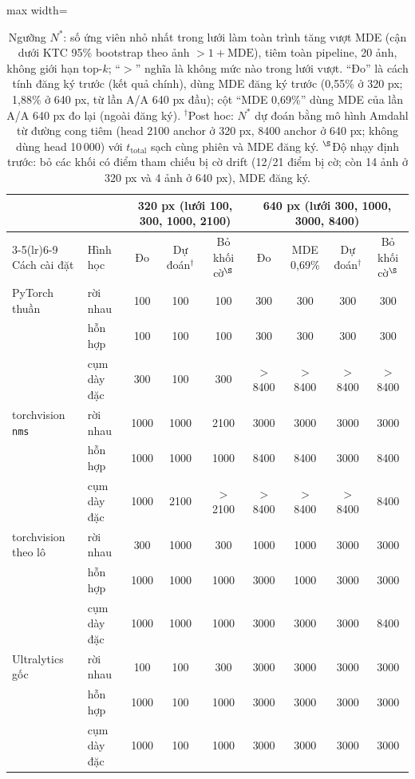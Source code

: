 \documentclass[a4paper,fleqn]{cas-dc}
\begin{document}
\begin{table}[!tp]
\centering\small
\caption{Ngưỡng $N^{*}$: số ứng viên nhỏ nhất trong lưới làm toàn trình tăng vượt MDE (cận dưới KTC 95\% bootstrap theo ảnh $>1+\mathrm{MDE}$), tiêm toàn pipeline, 20 ảnh, không giới hạn top-$k$; ``$>$'' nghĩa là không mức nào trong lưới vượt. ``Đo'' là cách tính đăng ký trước (kết quả chính), dùng MDE đăng ký trước (0,55\% ở 320 px; 1,88\% ở 640 px, từ lần A/A 640 px đầu); cột ``MDE 0,69\%'' dùng MDE của lần A/A 640 px đo lại (ngoài đăng ký). $^{\dagger}$Post hoc: $N^{*}$ dự đoán bằng mô hình Amdahl từ đường cong tiêm (head 2100 anchor ở 320 px, 8400 anchor ở 640 px; không dùng head 10\,000) với $t_{\mathrm{total}}$ sạch cùng phiên và MDE đăng ký. $^{\S}$Độ nhạy định trước: bỏ các khối có điểm tham chiếu bị cờ drift (12/21 điểm bị cờ; còn 14 ảnh ở 320 px và 4 ảnh ở 640 px), MDE đăng ký.}
\label{tab:nstar}
\begin{adjustbox}{max width=\textwidth}
\begin{tabular}{@{}llccccccc@{}}
\toprule
 & & \multicolumn{3}{c}{320 px (lưới 100, 300, 1000, 2100)} & \multicolumn{4}{c}{640 px (lưới 300, 1000, 3000, 8400)} \\
\cmidrule(lr){3-5}\cmidrule(lr){6-9}
Cách cài đặt & Hình học & Đo & Dự đoán$^{\dagger}$ & Bỏ khối cờ$^{\S}$ & Đo & MDE 0,69\% & Dự đoán$^{\dagger}$ & Bỏ khối cờ$^{\S}$ \\
\midrule
PyTorch thuần & rời nhau & 100 & 100 & 100 & 300 & 300 & 300 & 300 \\
 & hỗn hợp & 100 & 100 & 100 & 300 & 300 & 300 & 300 \\
 & cụm dày đặc & 300 & 100 & 300 & $>$8400 & $>$8400 & $>$8400 & $>$8400 \\
torchvision \texttt{nms} & rời nhau & 1000 & 1000 & 2100 & 3000 & 3000 & 3000 & 3000 \\
 & hỗn hợp & 1000 & 1000 & 1000 & 8400 & 8400 & 3000 & 8400 \\
 & cụm dày đặc & 1000 & 2100 & $>$2100 & $>$8400 & $>$8400 & $>$8400 & 8400 \\
torchvision theo lô & rời nhau & 300 & 1000 & 300 & 1000 & 1000 & 3000 & 3000 \\
 & hỗn hợp & 1000 & 1000 & 1000 & 3000 & 1000 & 3000 & 3000 \\
 & cụm dày đặc & 1000 & 1000 & 1000 & 3000 & 3000 & 3000 & 8400 \\
Ultralytics gốc & rời nhau & 100 & 100 & 300 & 3000 & 3000 & 3000 & 3000 \\
 & hỗn hợp & 1000 & 100 & 1000 & 3000 & 3000 & 3000 & 3000 \\
 & cụm dày đặc & 1000 & 100 & 1000 & 3000 & 3000 & 3000 & 3000 \\
\bottomrule
\end{tabular}
\end{adjustbox}
\end{table}
\end{document}
